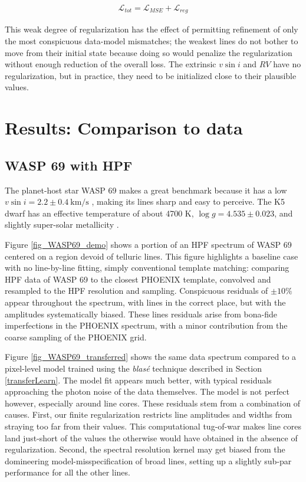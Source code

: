 \documentclass[twocolumn]{aastex631}
\begin{document}
\begin{eqnarray}
    \mathcal{L}_{tot} = \mathcal{L}_{MSE} + \mathcal{L}_{reg}
\end{eqnarray}

This weak degree of regularization has the effect of permitting refinement of only the most conspicuous data-model mismatches; the weakest lines do not bother to move from their initial state because doing so would penalize the regularization without enough reduction of the overall loss.  The extrinsic $v\sin{i}$ and $RV$ have no regularization, but in practice, they need to be initialized close to their plausible values.

\section{Results: Comparison to data}\label{secResults}
\subsection{WASP 69 with HPF}

The planet-host star WASP 69 makes a great benchmark because it has a low $v\sin{i}=2.2\pm0.4~\text{km/s}$ \citep{2017A&A...608A.135C}, making its lines sharp and easy to perceive.  The K5 dwarf has an effective temperature of about 4700 K, $\log{g}=4.535\pm0.023$, and slightly super-solar metallicity \citep{2014MNRAS.445.1114A}.

Figure \ref{fig_WASP69_demo} shows a portion of an HPF spectrum of WASP 69 centered on a region devoid of telluric lines.  This figure highlights a baseline case with no line-by-line fitting, simply conventional template matching: comparing HPF data of WASP 69 to the closest PHOENIX template, convolved and resampled to the HPF resolution and sampling.  Conspicuous residuals of $\pm10\%$ appear throughout the spectrum, with lines in the correct place, but with the amplitudes systematically biased.  These lines residuals arise from bona-fide imperfections in the PHOENIX spectrum, with a minor contribution from the coarse sampling of the PHOENIX grid.

Figure \ref{fig_WASP69_transferred} shows the same data spectrum compared to a pixel-level model trained using the \emph{blas\'e} technique described in Section \ref{transferLearn}.  The model fit appears much better, with typical residuals approaching the photon noise of the data themselves.  The model is not perfect however, especially around line cores.  These residuals stem from a combination of causes.  First, our finite regularization restricts line amplitudes and widths from straying too far from their values.  This computational tug-of-war makes line cores land just-short of the values the otherwise would have obtained in the absence of regularization.  Second, the spectral resolution kernel may get biased from the domineering model-misspecification of broad lines, setting up a slightly sub-par performance for all the other lines.
\end{document}
